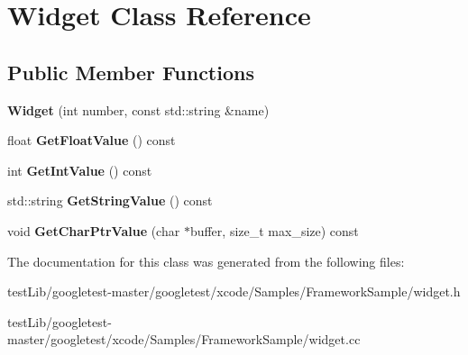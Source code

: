\hypertarget{classWidget}{}\section{Widget Class Reference}
\label{classWidget}
\subsection*{Public Member Functions}
\begin{DoxyCompactItemize}
\item 
\mbox{\label{classWidget_ab573b75a8a69d29c298af2485fb9cda9}} 
{\bfseries Widget} (int number, const std\+::string \&name)
\item 
\mbox{\label{classWidget_abf639d975e02cabda8132873aca1a333}} 
float {\bfseries Get\+Float\+Value} () const
\item 
\mbox{\label{classWidget_a15e7d0423020a7a98063a749fb97bdd3}} 
int {\bfseries Get\+Int\+Value} () const
\item 
\mbox{\label{classWidget_a7a6e3a7fca3a9373f631c94dc1494d22}} 
std\+::string {\bfseries Get\+String\+Value} () const
\item 
\mbox{\label{classWidget_a50791a556979f22f5593383143c7f815}} 
void {\bfseries Get\+Char\+Ptr\+Value} (char $\ast$buffer, size\+\_\+t max\+\_\+size) const
\end{DoxyCompactItemize}


The documentation for this class was generated from the following files\+:\begin{DoxyCompactItemize}
\item 
test\+Lib/googletest-\/master/googletest/xcode/\+Samples/\+Framework\+Sample/widget.\+h\item 
test\+Lib/googletest-\/master/googletest/xcode/\+Samples/\+Framework\+Sample/widget.\+cc\end{DoxyCompactItemize}
